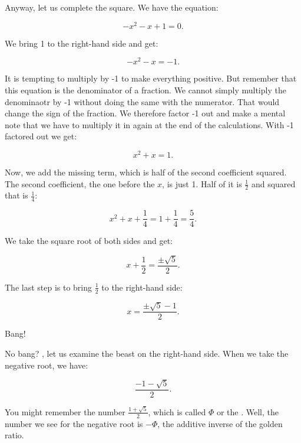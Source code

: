 \documentclass[tikz]{scrreprt}
\begin{document}
Anyway, let us complete the square. We have the equation:

\begin{equation}
-x^2 - x + 1 = 0.
\end{equation}

We bring 1 to the right-hand side and get:

\begin{equation}
-x^2 - x = -1.
\end{equation}

It is tempting to multiply by -1 to make everything positive.
But remember that this equation is the denominator of a fraction.
We cannot simply multiply the denominaotr by -1 without doing
the same with the numerator. That would change the sign of
the fraction. We therefore factor -1 out and make a mental note
that we have to multiply it in again at the end of the calculations.
With -1 factored out we get:

\begin{equation}
x^2 + x = 1.
\end{equation}


Now, we add the missing term, which is half of the
second coefficient squared. The second coefficient,
the one before the $x$, is just 1. Half of it is $\frac{1}{2}$
and squared that is $\frac{1}{4}$:

\begin{equation}
x^2 + x + \frac{1}{4} = 1 + \frac{1}{4} = \frac{5}{4}.
\end{equation}

We take the square root of both sides and get:

\begin{equation}
x + \frac{1}{2} = \frac{\pm\sqrt{5}}{2}.
\end{equation}

The last step is to bring $\frac{1}{2}$ to the right-hand side:

\begin{equation}
x = \frac{\pm\sqrt{5}-1}{2}.
\end{equation}

Bang!

No bang? , let us examine the beast on the right-hand side.
When we take the negative root, we have:

\[
\frac{-1-\sqrt{5}}{2}.
\]

You might remember the number $\frac{1+\sqrt{5}}{2}$,
which is called $\Phi$ or the .
Well, the number we see for the negative root is
$-\Phi$, the additive inverse of the golden ratio.
\end{document}
